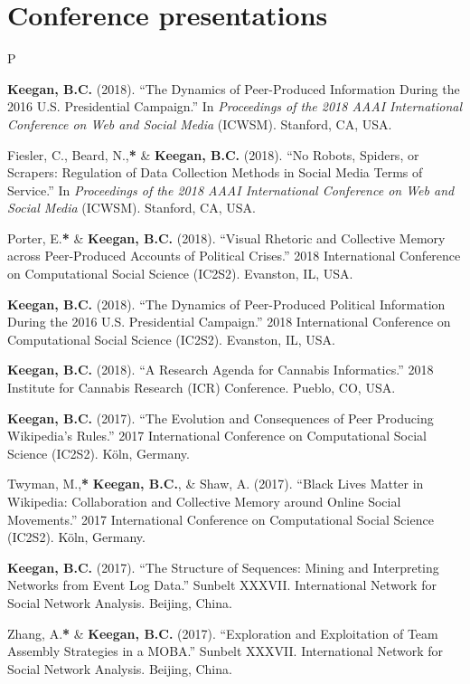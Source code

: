 \documentclass{cv}
\begin{document}
	\section{Conference presentations}
	\begin{entries}{P}
		\item \textbf{Keegan, B.C.} (2018). ``The Dynamics of Peer-Produced Information During the 2016 U.S. Presidential Campaign.'' In \textit{Proceedings of the 2018 AAAI International Conference on Web and Social Media} (ICWSM). Stanford, CA, USA.
		\item Fiesler, C., Beard, N.,\textbf{*} \& \textbf{Keegan, B.C.} (2018). ``No Robots, Spiders, or Scrapers: Regulation of Data Collection Methods in Social Media Terms of Service.'' In \textit{Proceedings of the 2018 AAAI International Conference on Web and Social Media} (ICWSM). Stanford, CA, USA.
		\item Porter, E.\textbf{*} \& \textbf{Keegan, B.C.} (2018). ``Visual Rhetoric and Collective Memory across Peer-Produced Accounts of Political Crises.'' 2018 International Conference on Computational Social Science (IC2S2). Evanston, IL, USA.
		\item \textbf{Keegan, B.C.} (2018). ``The Dynamics of Peer-Produced Political Information During the 2016 U.S. Presidential Campaign.'' 2018 International Conference on Computational Social Science (IC2S2). Evanston, IL, USA.
		\item \textbf{Keegan, B.C.} (2018). ``A Research Agenda for Cannabis Informatics.'' 2018 Institute for Cannabis Research (ICR) Conference. Pueblo, CO, USA.
		\item \textbf{Keegan, B.C.} (2017). ``The Evolution and Consequences of	Peer Producing Wikipedia's Rules.'' 2017 International Conference on Computational Social Science (IC2S2). K\"{o}ln, Germany.
		\item Twyman, M.,\textbf{*} \textbf{Keegan, B.C.}, \& Shaw, A. (2017). ``Black Lives Matter in Wikipedia: Collaboration and Collective Memory around Online Social Movements.'' 2017 International Conference on Computational Social Science (IC2S2). K\"{o}ln, Germany.
		\item \textbf{Keegan, B.C.} (2017). ``The Structure of Sequences: Mining and Interpreting Networks from Event Log Data.'' Sunbelt XXXVII. International Network for Social Network Analysis. Beijing, China.
		\item Zhang, A.\textbf{*} \& \textbf{Keegan, B.C.} (2017). ``Exploration and Exploitation of Team Assembly Strategies in a MOBA.'' Sunbelt XXXVII. International Network for Social Network Analysis. Beijing, China.

\end{entries}
\end{document}

